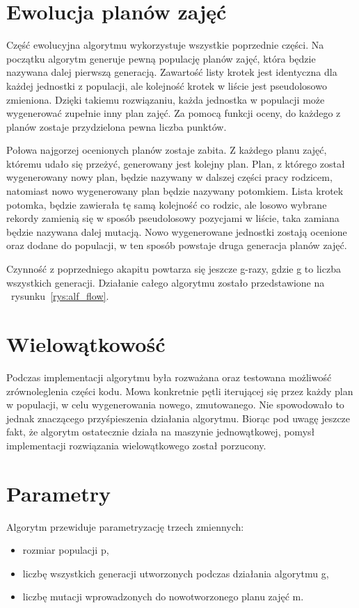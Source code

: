 \section{Ewolucja planów zajęć}

    Część ewolucyjna algorytmu wykorzystuje wszystkie poprzednie części. Na początku algorytm generuje pewną populację planów zajęć, która będzie nazywana dalej pierwszą generacją. Zawartość listy krotek jest identyczna dla każdej jednostki z populacji, ale kolejność krotek w liście jest pseudolosowo zmieniona. Dzięki takiemu rozwiązaniu, każda jednostka w populacji może wygenerować zupełnie inny plan zajęć. Za pomocą funkcji oceny, do każdego z planów zostaje przydzielona pewna liczba punktów. 

Połowa najgorzej ocenionych planów zostaje zabita. Z każdego planu zajęć, któremu udało się przeżyć, generowany jest kolejny plan. Plan, z którego został wygenerowany nowy plan, będzie nazywany w dalszej części pracy rodzicem, natomiast nowo wygenerowany plan będzie nazywany potomkiem. Lista krotek potomka, będzie zawierała tę samą kolejność co rodzic, ale losowo wybrane rekordy zamienią się w sposób pseudolosowy pozycjami w liście, taka zamiana będzie nazywana dalej mutacją. Nowo wygenerowane jednostki zostają ocenione oraz dodane do populacji, w ten sposób powstaje druga generacja planów zajęć.

    Czynność z poprzedniego akapitu powtarza się jeszcze g-razy, gdzie g to liczba wszystkich generacji. Działanie całego algorytmu zostało przedstawione na ~rysunku~\ref{rys:alf_flow}.


\section{Wielowątkowość}

Podczas implementacji algorytmu była rozważana oraz testowana możliwość zrównoleglenia części kodu. Mowa konkretnie pętli iterującej się przez każdy plan w populacji, w celu wygenerowania nowego, zmutowanego. Nie spowodowało to jednak znaczącego przyśpieszenia działania algorytmu. Biorąc pod uwagę jeszcze fakt, że algorytm ostatecznie działa na maszynie jednowątkowej, pomysł implementacji rozwiązania wielowątkowego został porzucony.


\section{Parametry}
Algorytm przewiduje parametryzację trzech zmiennych:
\begin{itemize}
	\item rozmiar populacji p,
	\item liczbę wszystkich generacji utworzonych podczas działania algorytmu g,
	\item liczbę mutacji wprowadzonych do nowotworzonego planu zajęć m.
\end{itemize}

